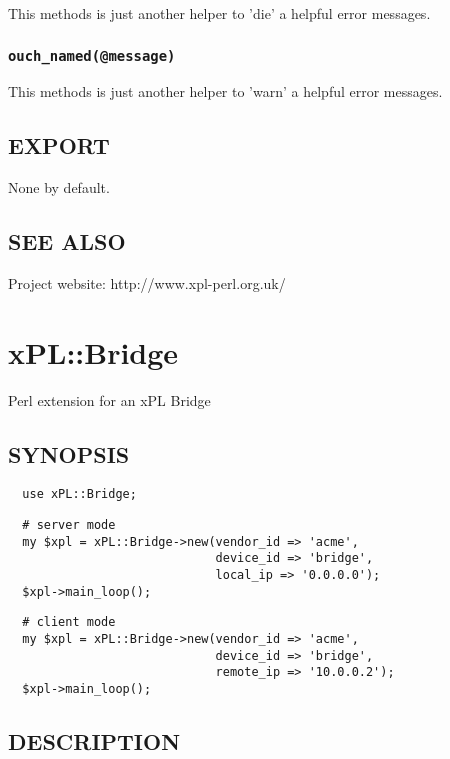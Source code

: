 This methods is just another helper to 'die' a helpful error messages.

\subsubsection*{\texttt{ouch\_named(@message)}\label{xPL::Base_ouch_named_message_}}


This methods is just another helper to 'warn' a helpful error messages.

\subsection*{EXPORT\label{xPL::Base_EXPORT}}


None by default.

\subsection*{SEE ALSO\label{xPL::Base_SEE_ALSO}}


Project website: http://www.xpl-perl.org.uk/

\section{xPL::Bridge\label{xPL::Bridge}}


Perl extension for an xPL Bridge

\subsection*{SYNOPSIS\label{xPL::Bridge_SYNOPSIS}}
\begin{verbatim}
  use xPL::Bridge;
\end{verbatim}
\begin{verbatim}
  # server mode
  my $xpl = xPL::Bridge->new(vendor_id => 'acme',
                             device_id => 'bridge',
                             local_ip => '0.0.0.0');
  $xpl->main_loop();
\end{verbatim}
\begin{verbatim}
  # client mode
  my $xpl = xPL::Bridge->new(vendor_id => 'acme',
                             device_id => 'bridge',
                             remote_ip => '10.0.0.2');
  $xpl->main_loop();
\end{verbatim}
\subsection*{DESCRIPTION\label{xPL::Bridge_DESCRIPTION}}


